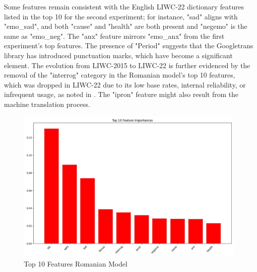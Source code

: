 Some features remain consistent with the English LIWC-22 dictionary features listed in the top 10 for the second experiment; for instance, "sad" aligns with "emo\_sad", and both "cause" and "health" are both present and "negemo" is the same as "emo\_neg". The "anx" feature mirrors "emo\_anx" from the first experiment’s top features. The presence of "Period" suggests that the Googletrans library has introduced punctuation marks, which have become a significant element. The evolution from LIWC-2015 to LIWC-22 is further evidenced by the removal of the "interrog" category in the Romanian model’s top 10 features, which was dropped in LIWC-22 due to its low base rates, internal reliability, or infrequent usage, as noted in \cite{boyd2022development}. The "ipron" feature might also result from the machine translation process.

\begin{figure}[htbp]
	\centering
		\includegraphics[scale=0.5]{LaTeX Bachelor Thesis Depression Signs Detection/figures/metrics/experimentRomanian/top10features.jpg}
	\caption{Top 10 Features Romanian Model}
	\label{top10FeaturesRomanianExperiment}
\end{figure}


